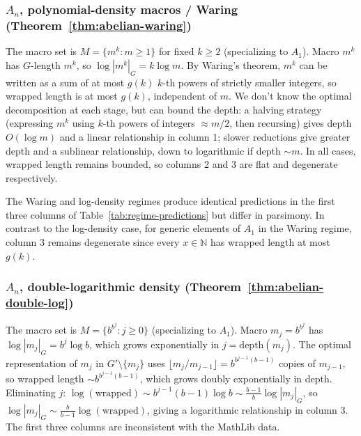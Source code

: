 \documentclass[12pt]{amsart}
\theoremstyle{definition}
\theoremstyle{remark}
\begin{document}
\subsubsection{$A_n$, polynomial-density macros / Waring 
(Theorem~\ref{thm:abelian-waring})}
The macro set is $M = \{m^k : m \geq 1\}$ for fixed $k \geq 2$ (specializing to $A_1$). 
Macro $m^k$ has $G$-length $m^k$, so $\log|m^k|_G = k \log m$.
By Waring's theorem, $m^k$ can be written as a sum of at most $g(k)$ $k$-th powers of strictly smaller integers, so wrapped length is at most $g(k)$, independent of $m$.
We don't know the optimal decomposition at each stage, but can bound the depth: a halving strategy (expressing $m^k$ using $k$-th powers of integers $\approx m/2$, then recursing) gives depth $O(\log m)$ and a linear relationship in column 1; slower reductions give greater depth and a sublinear relationship, down to logarithmic if depth $\sim m$.
In all cases, wrapped length remains bounded, so columns 2 and 3 are flat and degenerate respectively.

The Waring and log-density regimes produce identical predictions in the first three columns of Table~\ref{tab:regime-predictions} but differ in parsimony.
In contrast to the log-density case, for generic elements of $A_1$ in the Waring regime, column 3 remains degenerate since every $x \in \mathbb{N}$ has wrapped length at most $g(k)$.

\subsubsection{$A_n$, double-logarithmic density 
(Theorem~\ref{thm:abelian-double-log})}
The macro set is $M = \{b^{b^j} : j \geq 0\}$ (specializing to $A_1$). 
Macro $m_j = b^{b^j}$ has $\log|m_j|_G = b^j \log b$, which grows exponentially in $j = \mathrm{depth}(m_j)$.
The optimal representation of $m_j$ in $G' \setminus \{m_j\}$ uses 
$\lfloor m_j / m_{j-1} \rfloor = b^{b^{j-1}(b-1)}$ copies of $m_{j-1}$, so wrapped length $\sim b^{b^{j-1}(b-1)}$, which grows doubly exponentially in 
depth.
Eliminating $j$: $\log(\text{wrapped}) \sim b^{j-1}(b-1)\log b \sim 
\frac{b-1}{b} \log|m_j|_G$, so $\log|m_j|_G \sim \frac{b}{b-1} 
\log(\text{wrapped})$, giving a logarithmic relationship in column 3.
The first three columns are inconsistent with the MathLib data.
\end{document}
